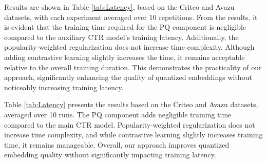 % 
Results are shown in Table \ref{tab:Latency}, based on the Criteo and Avazu datasets, with each experiment averaged over 10 repetitions. 
From the results, it is evident that the training time required for the PQ component is negligible compared to the auxiliary CTR model's training latency. 
Additionally, the popularity-weighted regularization does not increase time complexity. 
Although adding contrastive learning slightly increases the time, it remains acceptable relative to the overall training duration.
This demonstrates the practicality of our approach, significantly enhancing the quality of quantized embeddings without noticeably increasing training latency.

% 

Table \ref{tab:Latency} presents the results based on the Criteo and Avazu datasets, averaged over 10 runs. The PQ component adds negligible training time compared to the main CTR model. Popularity-weighted regularization does not increase time complexity, and while contrastive learning slightly increases training time, it remains manageable. Overall, our approach improves quantized embedding quality without significantly impacting training latency.
